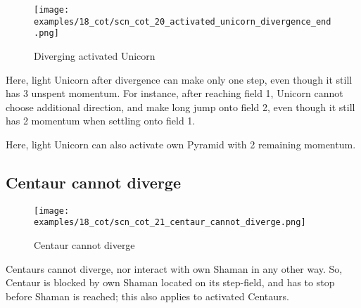 \clearpage %

\vspace*{-2.1\baselineskip}
\noindent
\begin{figure}[!h]
\texttt{[image: examples/18\_cot/scn\_cot\_20\_activated\_unicorn\_divergence\_end.png]}
\vspace*{-1.3\baselineskip}
\caption{Diverging activated Unicorn}
\label{fig:scn_cot_20_activated_unicorn_divergence_end}
\end{figure}

\vspace*{-0.4\baselineskip}
Here, light Unicorn after divergence can make only one step, even though it still
has 3 unspent momentum. For instance, after reaching field 1, Unicorn cannot choose
additional direction, and make long jump onto field 2, even though it still has 2
momentum when settling onto field 1.

Here, light Unicorn can also activate own Pyramid with 2 remaining momentum.

\clearpage %

\subsection*{Centaur cannot diverge}
\label{sec:Conquest of Tlalocan/Divergence/Centaur cannot diverge}

\vspace*{-1.4\baselineskip}
\noindent
\begin{figure}[!h]
\texttt{[image: examples/18\_cot/scn\_cot\_21\_centaur\_cannot\_diverge.png]}
\vspace*{-1.3\baselineskip}
\caption{Centaur cannot diverge}
\label{fig:scn_cot_21_centaur_cannot_diverge}
\end{figure}

\vspace*{-0.5\baselineskip}
Centaurs cannot diverge, nor interact with own Shaman in any other way. So, Centaur
is blocked by own Shaman located on its step-field, and has to stop before Shaman
is reached; this also applies to activated Centaurs.

\clearpage %

